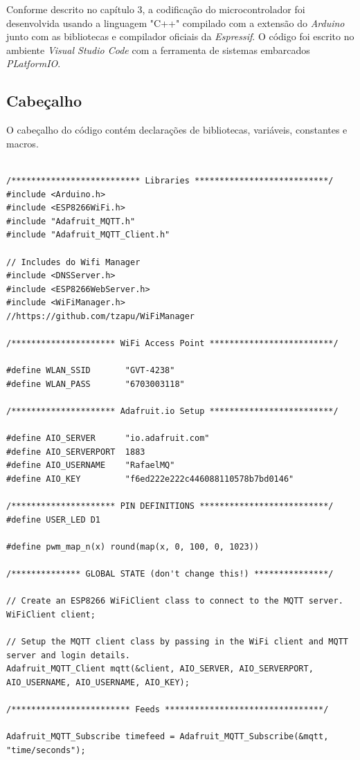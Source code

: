 Conforme descrito no capítulo 3, a codificação do microcontrolador foi desenvolvida usando a linguagem "C++" compilado com a extensão do \textit{Arduino} junto com as bibliotecas e compilador oficiais da \textit{Espressif}. O código foi escrito no ambiente \textit{Visual Studio Code} com a ferramenta de sistemas embarcados \textit{PLatformIO}.

\subsection{Cabeçalho}

O cabeçalho do código contém declarações de bibliotecas, variáveis, constantes e macros.

\begin{lstlisting}

/************************** Libraries ***************************/
#include <Arduino.h>
#include <ESP8266WiFi.h>
#include "Adafruit_MQTT.h"
#include "Adafruit_MQTT_Client.h"

// Includes do Wifi Manager
#include <DNSServer.h>
#include <ESP8266WebServer.h>
#include <WiFiManager.h>         //https://github.com/tzapu/WiFiManager

/********************* WiFi Access Point *************************/

#define WLAN_SSID       "GVT-4238"
#define WLAN_PASS       "6703003118"

/********************* Adafruit.io Setup *************************/

#define AIO_SERVER      "io.adafruit.com"
#define AIO_SERVERPORT  1883
#define AIO_USERNAME    "RafaelMQ"
#define AIO_KEY         "f6ed222e222c446088110578b7bd0146"

/********************* PIN DEFINITIONS **************************/
#define USER_LED D1

#define pwm_map_n(x) round(map(x, 0, 100, 0, 1023))

/************** GLOBAL STATE (don't change this!) ***************/

// Create an ESP8266 WiFiClient class to connect to the MQTT server.
WiFiClient client;

// Setup the MQTT client class by passing in the WiFi client and MQTT server and login details.
Adafruit_MQTT_Client mqtt(&client, AIO_SERVER, AIO_SERVERPORT, AIO_USERNAME, AIO_USERNAME, AIO_KEY);

/************************ Feeds ********************************/

Adafruit_MQTT_Subscribe timefeed = Adafruit_MQTT_Subscribe(&mqtt, "time/seconds");


\end{lstlisting}
